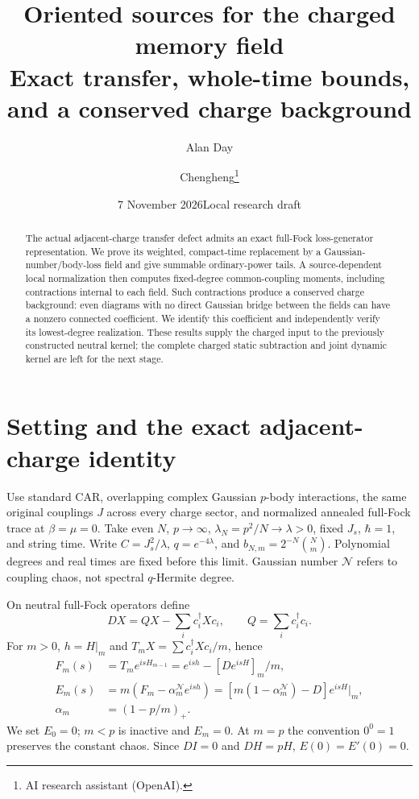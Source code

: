 \documentclass[11pt]{article}
\title{Oriented sources for the charged memory field\\
\large Exact transfer, whole-time bounds, and a conserved charge background}
\author{Alan Day \and Chengheng\thanks{AI research assistant (OpenAI).}}
\date{7 November 2026\quad Local research draft}
\newcommand{\NN}{\mathcal N}
\begin{document}
\maketitle
\begin{abstract}
The actual adjacent-charge transfer defect admits an exact full-Fock
loss-generator representation. We prove its weighted, compact-time
replacement by a Gaussian-number/body-loss field and give summable
ordinary-power tails. A source-dependent local normalization then
computes fixed-degree common-coupling moments, including contractions
internal to each field. Such contractions produce a conserved charge
background: even diagrams with no direct Gaussian bridge between the
fields can have a nonzero connected coefficient. We identify this
coefficient and independently verify its lowest-degree realization.
These results supply the charged input to the previously constructed
neutral kernel; the complete charged static subtraction and joint
dynamic kernel are left for the next stage.
\end{abstract}

\section{Setting and the exact adjacent-charge identity}
Use standard CAR, overlapping complex Gaussian $p$-body interactions,
the same original couplings $J$ across every charge sector, and normalized
annealed full-Fock trace at $\beta=\mu=0$. Take even $N$, $p\to\infty$,
$\lambda_N=p^2/N\to\lambda>0$, fixed $J_s$, $\hbar=1$, and string time.
Write $C=J_s^2/\lambda$, $q=e^{-4\lambda}$, and
$b_{N,m}=2^{-N}\binom Nm$. Polynomial degrees and real times are fixed
before this limit. Gaussian number $\NN$ refers to coupling chaos,
not spectral $q$-Hermite degree.

On neutral full-Fock operators define
\begin{equation}
 DX=QX-\sum_i c_i^\dagger Xc_i,\qquad Q=\sum_i c_i^\dagger c_i.
\end{equation}
For $m>0$, $h=H|_m$ and $T_mX=\sum c_i^\dagger Xc_i/m$, hence
\begin{align}
 F_m(s)&=T_m e^{isH_{m-1}}=e^{ish}-[De^{isH}]_m/m,\\
 E_m(s)&=m(F_m-\alpha_m^{\NN}e^{ish})
       =[m(1-\alpha_m^{\NN})-D]e^{isH}|_m, \label{eq:exact}\\
 \alpha_m&=(1-p/m)_+.
\end{align}
We set $E_0=0$; $m<p$ is inactive and $E_m=0$.
At $m=p$ the convention $0^0=1$ preserves the constant chaos.
Since $DI=0$ and $DH=pH$, $E(0)=E'(0)=0$.
\end{document}
